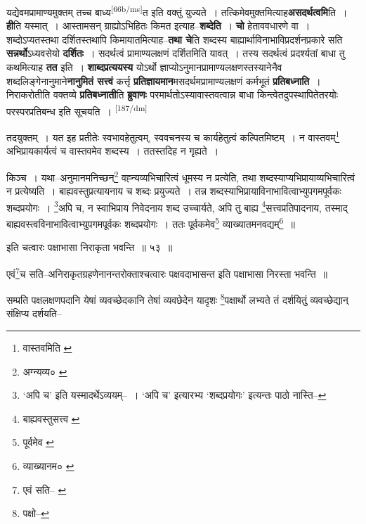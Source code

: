 \documentclass[article,12pt,a4paper]{memoir}
\begin{document}
	  \pstart यद्येवमप्रामाण्यमुक्तम् तच्च बाध्य\leavevmode\textsuperscript{\rmlatinfont\tiny [66b/ms]}त इति वक्तुं युज्यते । तत्किमेवमुक्तमित्याह\textbf{असदर्थत्वमि}ति । \textbf{ही}ति यस्मात् । आस्तामसन् ग्राह्योऽभिहितः किमत इत्याह--\textbf{शब्देति} । \textbf{चो} हेताववधारणे वा । शब्दोऽप्यतस्तथा दर्शितस्तथापि किमायातमित्याह--\textbf{तथा चे}ति शब्दस्य बाह्यार्थाविनाभाविप्रदर्शनप्रकारे सति \textbf{सन्नर्थो}ऽध्यवसेयो \textbf{दर्शितः} । सदर्थत्वं प्रामाण्यलक्षणं दर्शितमिति यावत् । तस्य सदर्थत्वं प्रदर्श्यतां बाधा तु कथमित्याह \textbf{तत} इति । \textbf{शाब्दप्रत्ययस्य} योऽर्थो ज्ञाप्योऽनुमानप्रामाण्यलक्षणस्तस्यानेनैव शब्दलिङ्गेनानुमाने\textbf{नानुमितं सत्त्वं} कर्त्तृ \textbf{प्रतिज्ञायमान}मसदर्थमप्रामाण्यलक्षणं कर्मभूतं \textbf{प्रतिबध्नाति} । निराकरोतीति वक्तव्ये \textbf{प्रतिबध्नाती}ति \textbf{ब्रुवाणः} परमार्थतोऽस्यावास्तवत्वान्न बाधा किन्त्वेतदुपस्थापितेतरयोः परस्परप्रतिबन्ध इति सूचयति ।
	\pend
      \leavevmode\textsuperscript{\rmlatinfont\tiny [187/dm]}

	  \pstart तदयुक्तम् । यत इह प्रतीतेः स्वभावहेतुत्वम्, स्ववचनस्य च कार्यहेतुत्वं कल्पितमिष्टम् । न वास्तवम्\footnote{वास्तवमिति \cite{dp-msC} \cite{dp-msD}} अभिप्रायकार्यत्वं च वास्तवमेव शब्दस्य । ततस्तदिह न गृह्यते ।
	\pend
       

	  \pstart किञ्च । यथा--अनुमानमनिच्छन्\footnote{अग्न्यव्य० \cite{dp-msD}} वह्न्यव्यभिचारित्वं धूमस्य न प्रत्येति, तथा शब्दस्याप्यभिप्रायाव्यभिचारित्वं न प्रत्येष्यति । बाह्यवस्तुप्रत्यायनाय च शब्दः प्रयुज्यते । तन्न शब्दस्याभिप्रायाविनाभावित्वाभ्युपगमपूर्वकः शब्दप्रयोगः । \footnote{‘अपि च’ इति यस्मादर्थेऽव्ययम्--\cite{dp-msD-n} । ‘अपि च’ इत्यारभ्य ‘शब्दप्रयोगः’ इत्यन्तः पाठो नास्ति--\cite{dp-msB}}अपि च, न स्वाभिप्राय निवेदनाय शब्द उच्चार्यते, अपि तु बाह्य \footnote{बाह्यवस्तुसत्त्व \cite{dp-msA} \cite{dp-msB} \cite{dp-msC} \cite{dp-msD} \cite{dp-edP} \cite{dp-edH} \cite{dp-edE} \cite{dp-edN}}सत्त्वप्रतिपादनाय, तस्माद् बाह्यवस्त्वविनाभावित्वाभ्युपगमपूर्वकः शब्दप्रयोगः । ततः पूर्वकमेव\footnote{पूर्वमेव \cite{dp-edE}} व्याख्यातमनवद्यम्\footnote{व्याख्यानम० \cite{dp-msA} \cite{dp-msB} \cite{dp-msC} \cite{dp-msD} \cite{dp-edP} \cite{dp-edH} \cite{dp-edE} \cite{dp-edN}} ॥
	\pend
       

	  \pstart इति चत्वारः पक्षाभासा निराकृता भवन्ति ॥ ५३ ॥
	\pend
       

	  \pstart एवं\footnote{एवं सति--\cite{dp-msA} \cite{dp-edP} \cite{dp-edN}}च सति--अनिराकृतग्रहणेनानन्तरोक्ताश्चत्वारः पक्षवदाभासन्त इति पक्षाभासा निरस्ता भवन्ति ॥
	\pend
       

	  \pstart सम्प्रति पक्षलक्षणपदानि येषां व्यवच्छेदकानि तेषां व्यवछेदेन यादृशः \footnote{पक्षो--\cite{dp-msC}}पक्षार्थो लभ्यते तं दर्शयितुं व्यवच्छेद्यान् संक्षिप्य दर्शयति--
	\pend
      
\end{document}
